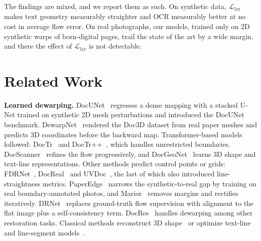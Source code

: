 \documentclass[conference]{IEEEtran}
\newcommand{\Llay}{\mathcal{L}_{\mathrm{lay}}}
\begin{document}
The findings are mixed, and we report them as such. On synthetic data, $\Llay$ makes text geometry measurably straighter and OCR measurably better at no cost in average flow error. On real photographs, our models, trained only on 2D synthetic warps of born-digital pages, trail the state of the art by a wide margin, and there the effect of $\Llay$ is not detectable.

\section{Related Work}
\textbf{Learned dewarping.}
DocUNet~\cite{ma2018docunet} regresses a dense mapping with a stacked U-Net trained on synthetic 2D mesh perturbations and introduced the DocUNet benchmark. DewarpNet~\cite{das2019dewarpnet} rendered the Doc3D dataset from real paper meshes and predicts 3D coordinates before the backward map. Transformer-based models followed: DocTr~\cite{feng2021doctr} and DocTr++~\cite{feng2024doctrpp}, which handles unrestricted boundaries. DocScanner~\cite{feng2025docscanner} refines the flow progressively, and DocGeoNet~\cite{feng2022docgeonet} learns 3D shape and text-line representations. Other methods predict control points or grids: FDRNet~\cite{xue2022fdrnet}, DocReal~\cite{yu2024docreal} and UVDoc~\cite{verhoeven2023uvdoc}, the last of which also introduced line-straightness metrics. PaperEdge~\cite{ma2022paperedge} narrows the synthetic-to-real gap by training on real boundary-annotated photos, and Marior~\cite{zhang2022marior} removes margins and rectifies iteratively. DRNet~\cite{liu2024drnet} replaces ground-truth flow supervision with alignment to the flat image plus a self-consistency term. DocRes~\cite{zhang2024docres} handles dewarping among other restoration tasks. Classical methods reconstruct 3D shape~\cite{brown2001document} or optimize text-line and line-segment models~\cite{tian2011rectification,kim2015textline,kil2017robust}.
\end{document}
